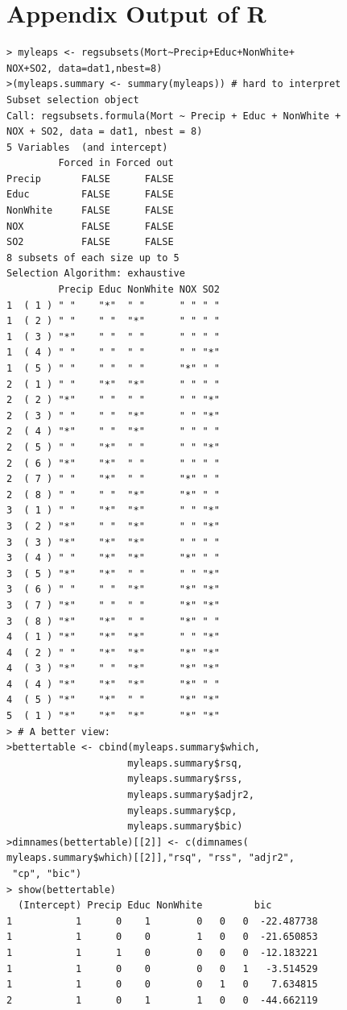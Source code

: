 \documentclass[12pt,a4paper]{article}
\begin{document}
\section{Appendix Output of R}
\begin{lstlisting}
> myleaps <- regsubsets(Mort~Precip+Educ+NonWhite+
NOX+SO2, data=dat1,nbest=8)
>(myleaps.summary <- summary(myleaps)) # hard to interpret
Subset selection object
Call: regsubsets.formula(Mort ~ Precip + Educ + NonWhite + 
NOX + SO2, data = dat1, nbest = 8)
5 Variables  (and intercept)
         Forced in Forced out
Precip       FALSE      FALSE
Educ         FALSE      FALSE
NonWhite     FALSE      FALSE
NOX          FALSE      FALSE
SO2          FALSE      FALSE
8 subsets of each size up to 5
Selection Algorithm: exhaustive
         Precip Educ NonWhite NOX SO2
1  ( 1 ) " "    "*"  " "      " " " "
1  ( 2 ) " "    " "  "*"      " " " "
1  ( 3 ) "*"    " "  " "      " " " "
1  ( 4 ) " "    " "  " "      " " "*"
1  ( 5 ) " "    " "  " "      "*" " "
2  ( 1 ) " "    "*"  "*"      " " " "
2  ( 2 ) "*"    " "  " "      " " "*"
2  ( 3 ) " "    " "  "*"      " " "*"
2  ( 4 ) "*"    " "  "*"      " " " "
2  ( 5 ) " "    "*"  " "      " " "*"
2  ( 6 ) "*"    "*"  " "      " " " "
2  ( 7 ) " "    "*"  " "      "*" " "
2  ( 8 ) " "    " "  "*"      "*" " "
3  ( 1 ) " "    "*"  "*"      " " "*"
3  ( 2 ) "*"    " "  "*"      " " "*"
3  ( 3 ) "*"    "*"  "*"      " " " "
3  ( 4 ) " "    "*"  "*"      "*" " "
3  ( 5 ) "*"    "*"  " "      " " "*"
3  ( 6 ) " "    " "  "*"      "*" "*"
3  ( 7 ) "*"    " "  " "      "*" "*"
3  ( 8 ) "*"    "*"  " "      "*" " "
4  ( 1 ) "*"    "*"  "*"      " " "*"
4  ( 2 ) " "    "*"  "*"      "*" "*"
4  ( 3 ) "*"    " "  "*"      "*" "*"
4  ( 4 ) "*"    "*"  "*"      "*" " "
4  ( 5 ) "*"    "*"  " "      "*" "*"
5  ( 1 ) "*"    "*"  "*"      "*" "*" 
> # A better view:
>bettertable <- cbind(myleaps.summary$which,
                     myleaps.summary$rsq, 
                     myleaps.summary$rss,
                     myleaps.summary$adjr2, 
                     myleaps.summary$cp, 
                     myleaps.summary$bic)
>dimnames(bettertable)[[2]] <- c(dimnames(
myleaps.summary$which)[[2]],"rsq", "rss", "adjr2",
 "cp", "bic")
> show(bettertable)
  (Intercept) Precip Educ NonWhite         bic
1           1      0    1        0   0   0  -22.487738
1           1      0    0        1   0   0  -21.650853
1           1      1    0        0   0   0  -12.183221
1           1      0    0        0   0   1   -3.514529
1           1      0    0        0   1   0    7.634815
2           1      0    1        1   0   0  -44.662119

\end{lstlisting}
\end{document}
